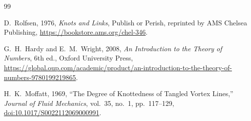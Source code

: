 \documentclass[11pt]{article}
\begin{document}
\begin{thebibliography}{99}

D.~Rolfsen,
1976,
\emph{Knots and Links},
Publish or Perish,
reprinted by AMS Chelsea Publishing,
\url{https://bookstore.ams.org/chel-346}.

G.~H.~Hardy and E.~M.~Wright,
2008,
\emph{An Introduction to the Theory of Numbers},
6th ed., Oxford University Press,
\url{https://global.oup.com/academic/product/an-introduction-to-the-theory-of-numbers-9780199219865}.

H.~K.~Moffatt,
1969,
``The Degree of Knottedness of Tangled Vortex Lines,''
\emph{Journal of Fluid Mechanics}, vol.~35, no.~1, pp.~117--129,
\href{https://doi.org/10.1017/S0022112069000991}{doi:10.1017/S0022112069000991}.

\end{thebibliography}
\end{document}
